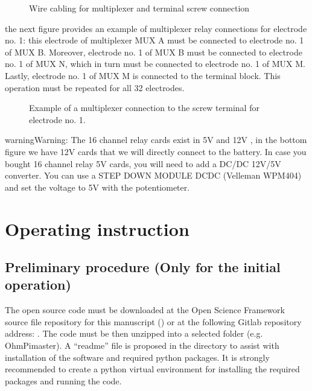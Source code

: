 \documentclass[letterpaper,10pt,english]{sphinxmanual}
\let\sphinxpxdimen\pdfpxdimen\else\newdimen\sphinxpxdimen
\begin{document}
\begin{figure}[htbp]
\centering
\capstart

\noindent\sphinxincludegraphics[width=800\sphinxpxdimen,height=300\sphinxpxdimen]{{cable}.jpg}
\caption{Wire cabling for multiplexer and terminal screw connection}\label{\detokenize{V2_00:id8}}\end{figure}

\sphinxAtStartPar
the next figure provides an example of multiplexer relay connections for electrode no. 1: this electrode of multiplexer MUX A must be connected to electrode no. 1 of MUX B. Moreover, electrode no. 1 of MUX B
must be connected to electrode no. 1 of MUX N, which in turn must be connected to electrode no. 1 of MUX M. Lastly, electrode no. 1 of MUX M is connected to the terminal block.
This operation must be repeated for all 32 electrodes.

\begin{figure}[htbp]
\centering
\capstart

\noindent\sphinxincludegraphics[width=800\sphinxpxdimen,height=800\sphinxpxdimen]{{electrode_cable}.jpg}
\caption{Example of a multiplexer connection to the screw terminal for electrode no. 1.}\label{\detokenize{V2_00:id9}}\end{figure}

\begin{sphinxadmonition}{warning}{Warning:}
\sphinxAtStartPar
The 16 channel relay cards exist in 5\sphinxhyphen{}V and 12\sphinxhyphen{}V , in the bottom figure we have 12\sphinxhyphen{}V cards that we will directly connect to the battery.
In case you bought 16 channel relay 5\sphinxhyphen{}V cards, you will need to add a DC/DC 12\sphinxhyphen{}V/5\sphinxhyphen{}V converter. You can use a STEP DOWN MODULE DC\sphinxhyphen{}DC (Velleman WPM404) and set the voltage to 5V with the potentiometer.
\end{sphinxadmonition}


\section{Operating instruction}
\label{\detokenize{V2_00:operating-instruction}}

\subsection{Preliminary procedure (Only for the initial operation)}
\label{\detokenize{V2_00:preliminary-procedure-only-for-the-initial-operation}}
\sphinxAtStartPar
The open source code must be downloaded at the Open Science Framework source file repository for this manuscript ()
or at the following Gitlab repository address: . The code must be then unzipped into a selected folder (e.g. OhmPi\sphinxhyphen{}master). A “readme” file
is proposed in the directory to assist with installation of the software and required python packages. It is strongly recommended to create a python virtual environment for installing
the required packages and running the code.
\end{document}
